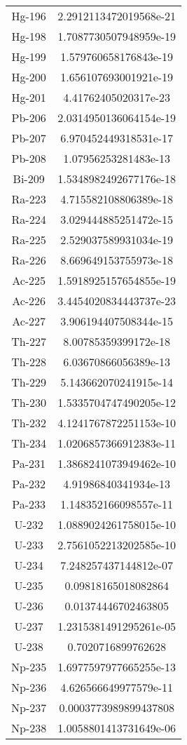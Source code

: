 \begin{table}[h!]
\begin{tabular}{|| c || c |}
Hg-196 & 2.2912113472019568e-21 \\
Hg-198 & 1.7087730507948959e-19 \\
Hg-199 & 1.579760658176843e-19 \\
Hg-200 & 1.656107693001921e-19 \\
Hg-201 & 4.41762405020317e-23 \\
Pb-206 & 2.0314950136064154e-19 \\
Pb-207 & 6.970452449318531e-17 \\
Pb-208 & 1.07956253281483e-13 \\
Bi-209 & 1.5348982492677176e-18 \\
Ra-223 & 4.715582108806389e-18 \\
Ra-224 & 3.029444885251472e-15 \\
Ra-225 & 2.529037589931034e-19 \\
Ra-226 & 8.669649153755973e-18 \\
Ac-225 & 1.5918925157654855e-19 \\
Ac-226 & 3.4454020834443737e-23 \\
Ac-227 & 3.906194407508344e-15 \\
Th-227 & 8.00785359399172e-18 \\
Th-228 & 6.03670866056389e-13 \\
Th-229 & 5.143662070241915e-14 \\
Th-230 & 1.5335704747490205e-12 \\
Th-232 & 4.1241767872251153e-10 \\
Th-234 & 1.0206857366912383e-11 \\
Pa-231 & 1.3868241073949462e-10 \\
Pa-232 & 4.91986840341934e-13 \\
Pa-233 & 1.148352166098557e-11 \\
U-232 & 1.0889024261758015e-10 \\
U-233 & 2.7561052213202585e-10 \\
U-234 & 7.248257437144812e-07 \\
U-235 & 0.09818165018082864 \\
U-236 & 0.01374446702463805 \\
U-237 & 1.2315381491295261e-05 \\
U-238 & 0.7020716899762628 \\
Np-235 & 1.6977597977665255e-13 \\
Np-236 & 4.626566649977579e-11 \\
Np-237 & 0.0003773989899437808 \\
Np-238 & 1.0058801413731649e-06 \\

\end{tabular}
\end{table}
